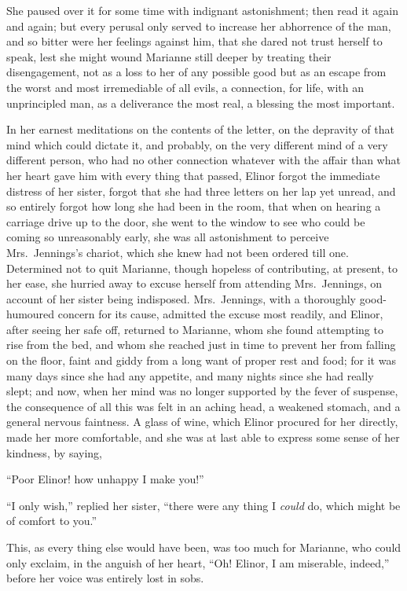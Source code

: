 She paused over it for some time with indignant
astonishment; then read it again and again; but every
perusal only served to increase her abhorrence of the man,
and so bitter were her feelings against him, that she
dared not trust herself to speak, lest she might wound
Marianne still deeper by treating their disengagement,
not as a loss to her of any possible good but as an
escape from the worst and most irremediable of all
evils, a connection, for life, with an unprincipled man,
as a deliverance the most real, a blessing the most important.

In her earnest meditations on the contents of the letter,
on the depravity of that mind which could dictate it,
and probably, on the very different mind of a very different
person, who had no other connection whatever with the affair
than what her heart gave him with every thing that passed,
Elinor forgot the immediate distress of her sister,
forgot that she had three letters on her lap yet unread,
and so entirely forgot how long she had been in the room,
that when on hearing a carriage drive up to the door,
she went to the window to see who could be coming so
unreasonably early, she was all astonishment to perceive
Mrs.\ Jennings's chariot, which she knew had not been
ordered till one.  Determined not to quit Marianne,
though hopeless of contributing, at present, to her ease,
she hurried away to excuse herself from attending
Mrs.\ Jennings, on account of her sister being indisposed.
Mrs.\ Jennings, with a thoroughly good-humoured concern
for its cause, admitted the excuse most readily, and Elinor,
after seeing her safe off, returned to Marianne, whom she
found attempting to rise from the bed, and whom she reached
just in time to prevent her from falling on the floor,
faint and giddy from a long want of proper rest and food;
for it was many days since she had any appetite, and many
nights since she had really slept; and now, when her
mind was no longer supported by the fever of suspense,
the consequence of all this was felt in an aching head,
a weakened stomach, and a general nervous faintness.
A glass of wine, which Elinor procured for her directly,
made her more comfortable, and she was at last able to express
some sense of her kindness, by saying,

``Poor Elinor! how unhappy I make you!''

``I only wish,'' replied her sister, ``there were
any thing I \emph{could} do, which might be of comfort to you.''

This, as every thing else would have been,
was too much for Marianne, who could only exclaim,
in the anguish of her heart, ``Oh! Elinor, I am miserable,
indeed,'' before her voice was entirely lost in sobs.

